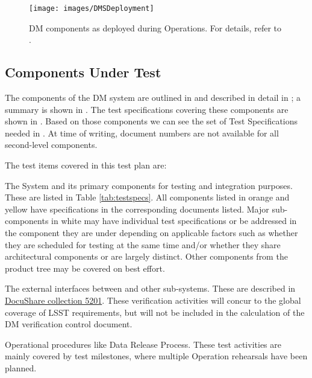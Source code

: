 \begin{figure}[htbp]
	\begin{center}
		\texttt{[image: images/DMSDeployment]}
		\caption{DM components as deployed during Operations. For details, refer to .
		\label{fig:dmsdeploy}}
	\end{center}
\end{figure}

\subsection{Components Under Test}\label{sect:components}

The components of the DM system are outlined in  and described in detail in ; a summary is shown in .
The test specifications covering these components are shown in .
Based on those components we can see the set of Test Specifications needed in .
At time of writing, document numbers are not available for all second-level components.

The test items covered in this test plan are:

\begin{itemize_single}

\item The \product{} System and its primary components for testing and integration purposes. These are listed in Table \ref{tab:testspecs}. 
All components listed in orange and yellow have specifications in the corresponding documents listed. 
Major sub-components in white may have individual test specifications or be addressed in the component they are under depending on applicable factors such as whether they are scheduled for testing at the same time and/or whether they share architectural components or are largely distinct.
Other components from the product tree may be covered on best effort.

\item The external interfaces between \product{} and other sub-systems. These are described in \href{https://ls.st/Collection-5201}{DocuShare collection 5201}. These verification activities will concur to the global coverage of LSST requirements, but will not be included in the calculation of the DM verification control document. 

\item Operational procedures like Data Release Process. These test activities are mainly covered by test milestones, where multiple Operation rehearsals have been planned.

\end{itemize_single}


